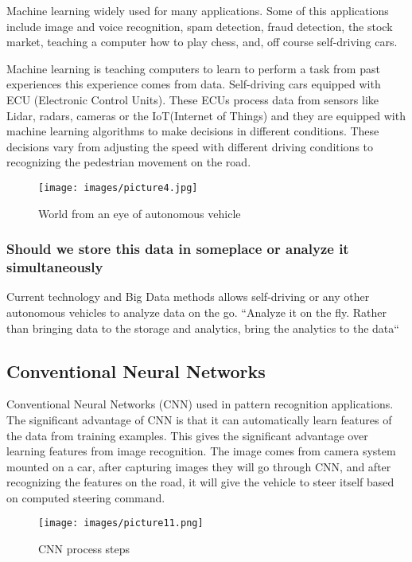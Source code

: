 \documentclass[sigconf]{acmart}
\begin{document}
Machine learning widely used for many applications. Some of this applications include image and voice recognition, spam detection, fraud detection, the stock market, teaching a computer how to play chess, and, off course self-driving cars. 
\par Machine learning is teaching computers to learn to perform a task from past experiences this experience comes from data. Self-driving cars equipped with ECU (Electronic Control Units). These ECUs process data from sensors like Lidar, radars, cameras or the IoT(Internet of Things) and they are equipped with machine learning algorithms to make decisions in different conditions.\cite{www-kdnuggets} These decisions vary from adjusting the speed with different driving conditions to recognizing the pedestrian movement on the road. 

\begin{figure}[!ht]
  \centering
      \texttt{[image: images/picture4.jpg]}
  \caption{World from an eye of autonomous vehicle}\label{F:Lidar}
\end{figure}

\subsubsection{Should we store this data in someplace or analyze it simultaneously}
Current technology and Big Data methods allows self-driving or any other autonomous vehicles to analyze data on the go.\cite{www-sas} 
    ``Analyze it on the fly. Rather than bringing data to the storage and analytics, bring the analytics to the data``\cite{www-sas}

\subsection{Conventional Neural Networks}

Conventional Neural Networks (CNN)\cite{nvidia} used in pattern recognition applications. The significant advantage of CNN is that it can automatically learn features of the data from training examples. \cite{nvidia} This gives the significant advantage over learning features from image recognition. The image comes from camera system mounted on a car, after capturing images they will go through CNN, and after recognizing the features on the road, it will give the vehicle to steer itself based on computed steering command.\cite{nvidia} 

\begin{figure}[!ht]
  \centering
      \texttt{[image: images/picture11.png]}
  \caption{CNN process steps}\label{F:nvidiaCNNmodel}
\end{figure}
\end{document}

